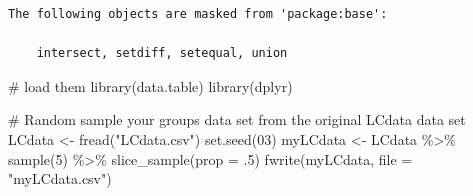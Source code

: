 \documentclass[
  letterpaper,
  DIV=11,
  numbers=noendperiod]{scrartcl}
\newenvironment{Shaded}{\begin{snugshade}}{\end{snugshade}}
\newcommand{\AttributeTok}[1]{\textcolor[rgb]{0.40,0.45,0.13}{#1}}
\newcommand{\CommentTok}[1]{\textcolor[rgb]{0.37,0.37,0.37}{#1}}
\newcommand{\DecValTok}[1]{\textcolor[rgb]{0.68,0.00,0.00}{#1}}
\newcommand{\FunctionTok}[1]{\textcolor[rgb]{0.28,0.35,0.67}{#1}}
\newcommand{\NormalTok}[1]{\textcolor[rgb]{0.00,0.23,0.31}{#1}}
\newcommand{\OtherTok}[1]{\textcolor[rgb]{0.00,0.23,0.31}{#1}}
\newcommand{\SpecialCharTok}[1]{\textcolor[rgb]{0.37,0.37,0.37}{#1}}
\newcommand{\StringTok}[1]{\textcolor[rgb]{0.13,0.47,0.30}{#1}}
\begin{document}
\begin{verbatim}
The following objects are masked from 'package:base':

    intersect, setdiff, setequal, union
\end{verbatim}

\begin{Shaded}
\begin{Highlighting}[]
\CommentTok{\# load them}
\FunctionTok{library}\NormalTok{(data.table)}
\FunctionTok{library}\NormalTok{(dplyr)}
\end{Highlighting}
\end{Shaded}

\begin{Shaded}
\begin{Highlighting}[]
\CommentTok{\# Random sample your group\textquotesingle{}s data set from the original LCdata data set}
\NormalTok{LCdata }\OtherTok{\textless{}{-}} \FunctionTok{fread}\NormalTok{(}\StringTok{"LCdata.csv"}\NormalTok{)}
\FunctionTok{set.seed}\NormalTok{(}\DecValTok{03}\NormalTok{)}
\NormalTok{myLCdata }\OtherTok{\textless{}{-}}\NormalTok{ LCdata }\SpecialCharTok{\%\textgreater{}\%} \FunctionTok{sample}\NormalTok{(}\DecValTok{5}\NormalTok{) }\SpecialCharTok{\%\textgreater{}\%} \FunctionTok{slice\_sample}\NormalTok{(}\AttributeTok{prop =}\NormalTok{ .}\DecValTok{5}\NormalTok{)}
\FunctionTok{fwrite}\NormalTok{(myLCdata, }\AttributeTok{file =} \StringTok{"myLCdata.csv"}\NormalTok{)}
\end{Highlighting}
\end{Shaded}
\end{document}
